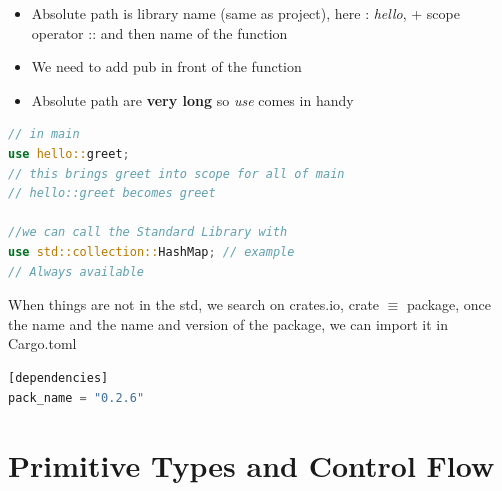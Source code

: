 \documentclass{report}
\begin{document}
\begin{multicols*}{2}
\begin{itemize}
  \item Absolute path is library name (same as project), here : \textit{hello}, + scope operator :: and then name of the function 
  \item We need to add pub in front of the function 
  \item Absolute path are \textbf{very long} so \textit{use} comes in handy
\end{itemize}

\begin{tcolorbox}[title=use,colback=backcolour,size=small,left=4mm]
\begin{lstlisting}[language=rust]
// in main
use hello::greet;
// this brings greet into scope for all of main
// hello::greet becomes greet

//we can call the Standard Library with
use std::collection::HashMap; // example
// Always available
\end{lstlisting}
\end{tcolorbox}

When things are not in the std, we search on crates.io, crate $\equiv$ package, once the name
and the name and version of the package, we can import it in Cargo.toml

\begin{tcolorbox}[title=Cargo.toml,colback=backcolour,size=small,left=4mm]
\begin{lstlisting}[language=rust]
[dependencies]
pack_name = "0.2.6"
\end{lstlisting}
\end{tcolorbox}

\end{multicols*}

\chapter{Primitive Types and Control Flow}
\end{document}
